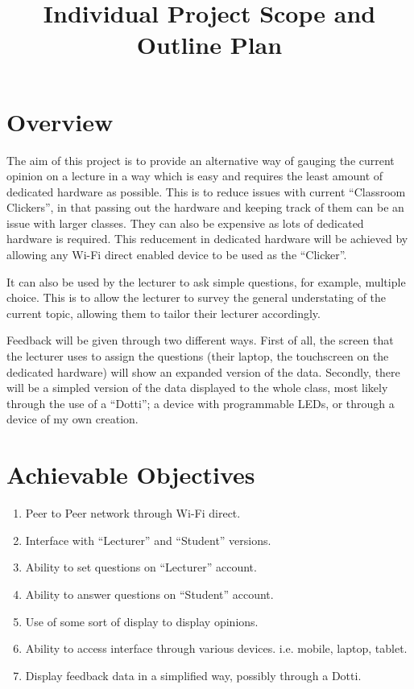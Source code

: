 \documentclass{article}
\title{
\textmd{\textbf{Individual Project Scope and Outline Plan}}\\
}
\author{\textbf{\hmwkAuthorName}}
\begin{document}

\section{Overview}
The aim of this project is to provide an alternative way of gauging the current opinion on a lecture in a way which is easy and requires the least amount of dedicated hardware as possible. This is to reduce issues with current ``Classroom Clickers'', in that passing out the hardware and keeping track of them can be an issue with larger classes. They can also be expensive as lots of dedicated hardware is required. This reducement in dedicated hardware will be achieved by allowing any Wi-Fi direct enabled device to be used as the ``Clicker''.

It can also be used by the lecturer to ask simple questions, for example, multiple choice. This is to allow the lecturer to survey the general understating of the current topic, allowing them to tailor their lecturer accordingly.

Feedback will be given through two different ways. First of all, the screen that the lecturer uses to assign the questions (their laptop, the touchscreen on the dedicated hardware) will show an expanded version of the data. Secondly, there will be a simpled version of the data displayed to the whole class, most likely through the use of a ``Dotti''; a device with programmable LEDs, or through a device of my own creation.

\section{Achievable Objectives}
\begin{enumerate}
	\item Peer to Peer network through Wi-Fi direct.
	\item Interface with ``Lecturer'' and ``Student'' versions.
	\item Ability to set questions on ``Lecturer'' account.
	\item Ability to answer questions on ``Student'' account. 
	\item Use of some sort of display to display opinions.
	\item Ability to access interface through various devices. i.e. mobile, laptop, tablet.
	\item Display feedback data in a simplified way, possibly through a Dotti.
\end{enumerate}
\end{document}
